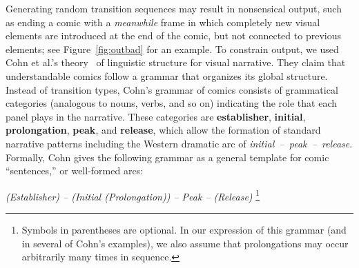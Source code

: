 Generating random transition sequences may result in nonsensical output,
such as ending a comic with a \emph{meanwhile} frame in which completely new
visual elements are introduced at the end of the comic, but not connected to 
previous elements; see Figure~\ref{fig:outbad} for an example. 
To constrain output, we used Cohn et al.'s theory~\cite{cohn2016visual}
of linguistic structure for visual narrative. They claim that
understandable comics follow a grammar that organizes its global structure.
Instead of transition types, Cohn's grammar of comics consists of
grammatical categories (analogous to nouns, verbs, and so on) indicating
the role that each panel plays in the narrative. These categories are {\bf
establisher}, {\bf initial}, {\bf prolongation}, {\bf peak}, and {\bf
release}, which allow the formation of standard narrative patterns
including the Western dramatic arc of \hbox{\em initial -- peak --
release}. Formally, Cohn gives the following grammar as a general template
for comic ``sentences,'' or well-formed arcs:

{\it (Establisher) -- (Initial (Prolongation)) -- Peak -- (Release)}
\footnote{Symbols in parentheses are optional. In our expression of this grammar (and
in several of Cohn's examples), we also assume that prolongations may occur
arbitrarily many times in sequence.}

